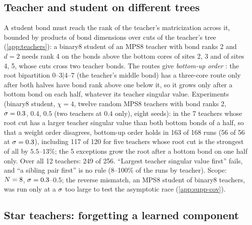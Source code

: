 \subsection{Teacher and student on different trees}\label{sec:teacher-mismatch}

A student bond must reach the rank of the teacher's matricization across it, bounded by products of
bond dimensions over cuts of the teacher's tree \proven{}  (\cref{app:teachers}): a binary8 student of an MPS8 teacher
with bond ranks 2 and $d=2$ needs rank 4 on the bonds above the bottom cores of sites 2, 3 and of sites
4, 5, whose cuts cross two teacher bonds. The routes give \emph{bottom-up order} \derived{} \newresult: the root
bipartition $0$--$3|4$--$7$ (the teacher's middle bond) has a three-core route only after both halves have
bond rank above one below it, so it grows only after a bottom bond on each half, whatever its teacher
singular value. Experiments \empirical{} \newresult{} (binary8 student, $\chi=4$, twelve random MPS8 teachers
with bond ranks 2, $\sigma=0.3$, $0.4$, $0.5$ (two teachers at $0.4$ only), eight seeds): in the 7 teachers whose
root cut has a larger teacher
singular value than both bottom bonds of a half, so that a weight order disagrees, bottom-up order holds
in 163 of 168 runs (56 of 56 at $\sigma=0.3$), including 117 of 120 for five teachers whose root cut is the
strongest of all by $5.5$--$13\%$; the 5 exceptions grow the root after a bottom bond on one half only. Over
all 12 teachers: 249 of 256. ``Largest teacher singular value first'' fails, and ``a sibling pair first''
is no rule (8--100\% of the runs by teacher). Scope: $N=8$, $\sigma=0.3$--$0.5$; the reverse mismatch, an MPS8
student of binary8 teachers, was run only at a $\sigma$ too large to test the asymptotic race
(\cref{app:supp-cov}).

\subsection{Star teachers: forgetting a learned component}\label{sec:teacher-star}

